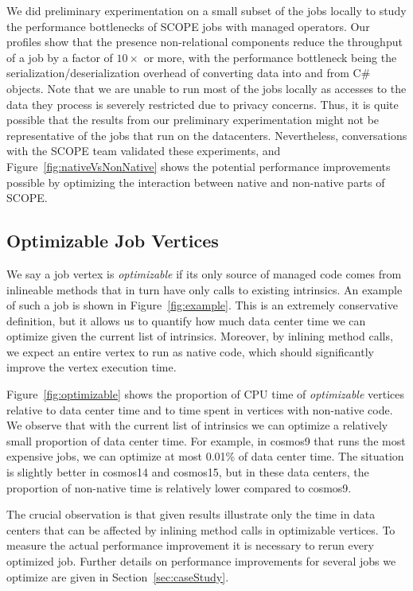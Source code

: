 We did preliminary experimentation on a small subset of the jobs locally to study the performance bottlenecks of SCOPE jobs with managed operators. 
Our profiles show that the presence non-relational components reduce the throughput of a job by a factor of $10\times$ or more, with the performance bottleneck being the serialization/deserialization overhead of converting data into and from C\# objects. Note that we are unable to run most of the jobs locally as accesses to the data they process is severely restricted due to privacy concerns. Thus, it is quite possible that the results from our preliminary experimentation might not be representative of the jobs that run on the datacenters. Nevertheless, conversations with the SCOPE team validated these experiments, and Figure~\ref{fig:nativeVsNonNative} shows the potential performance improvements possible by optimizing the interaction between native and non-native parts of SCOPE. 




\subsection{Optimizable Job Vertices}
We say a job vertex is \emph{optimizable} if its only source of managed code comes from inlineable methods that in turn have only calls to existing intrinsics. 
An example of such a job is shown in Figure~\ref{fig:example}.
This is an extremely conservative definition, but it allows us to quantify how much data center time we can optimize given the current list of intrinsics. 
Moreover, by inlining method calls, we expect an entire vertex to run as native code, which should significantly improve the vertex execution time.

Figure~\ref{fig:optimizable} shows the proportion of CPU time of \emph{optimizable} vertices relative to data center time and to time spent in vertices with non-native code. 
We observe that with the current list of intrinsics we can optimize a relatively small proportion of data center time. 
For example, in cosmos9 that runs the most expensive jobs, we can optimize at most 0.01\% of data center time. 
The situation is slightly better in cosmos14 and cosmos15, but in these data centers, the proportion of non-native time is relatively lower compared to cosmos9.

The crucial observation is that given results illustrate only the time in data centers that can be affected by inlining method calls in optimizable vertices. 
To measure the actual performance improvement it is necessary to rerun every optimized job. 
Further details on performance improvements for several jobs we optimize are given in Section~\ref{sec:caseStudy}.

